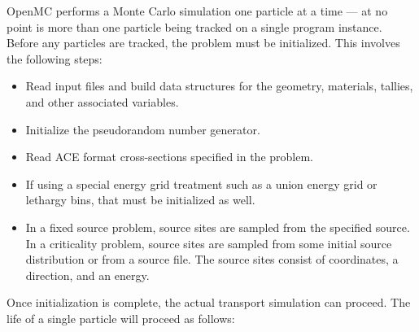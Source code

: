 OpenMC performs a Monte Carlo simulation one particle at a time --- at no point
is more than one particle being tracked on a single program instance. Before any
particles are tracked, the problem must be initialized. This involves the
following steps:
\begin{itemize}
\item Read input files and build data structures for the geometry, materials,
  tallies, and other associated variables.
\item Initialize the pseudorandom number generator.
\item Read ACE format cross-sections specified in the problem.
\item If using a special energy grid treatment such as a union energy grid or
    lethargy bins, that must be initialized as well.
\item In a fixed source problem, source sites are sampled from the specified
    source. In a criticality problem, source sites are sampled from some initial
    source distribution or from a source file. The source sites consist of
    coordinates, a direction, and an energy.
\end{itemize}
Once initialization is complete, the actual transport simulation can
proceed. The life of a single particle will proceed as follows:
